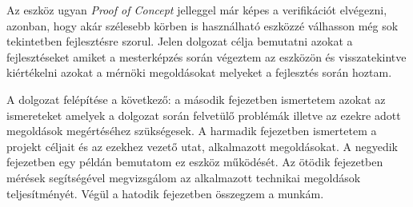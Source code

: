 Az eszköz ugyan \emph{Proof of Concept} jelleggel már képes a verifikációt elvégezni, azonban, hogy akár szélesebb körben is használható eszközzé válhasson még sok tekintetben fejlesztésre szorul. Jelen dolgozat célja bemutatni azokat a fejlesztéseket amiket a mesterképzés során végeztem az eszközön és visszatekintve kiértékelni azokat a mérnöki megoldásokat melyeket a fejlesztés során hoztam.

A dolgozat felépítése a következő: a második fejezetben ismertetem azokat az ismereteket amelyek a dolgozat során felvetülő problémák illetve az ezekre adott megoldások megértéséhez szükségesek. A harmadik fejezetben ismertetem a projekt céljait és az ezekhez vezető utat, alkalmazott megoldásokat. A negyedik fejezetben egy példán bemutatom ez eszköz működését. Az ötödik fejezetben mérések segítségével megvizsgálom az alkalmazott technikai megoldások teljesítményét. Végül a hatodik fejezetben összegzem a munkám.